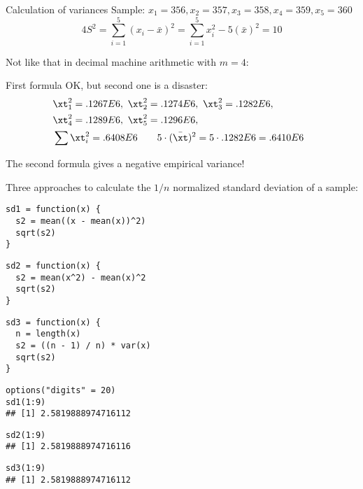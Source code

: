 \documentclass[11pt,compress,t,notes=noshow, xcolor=table]{beamer}
\begin{document}
\begin{vbframe}{Calculation of variances}
Sample: $x_1 = 356, x_2 = 357, x_3 = 358, x_4 = 359, x_5 = 360$
$$
4 S^2 = \sum\limits_{i=1}^5 (x_i - \bar x)^2 = \sum\limits_{i=1}^5 x_i^2 - 5(\bar x)^2 = 10
$$

Not like that in decimal machine arithmetic with $m=4$:

\lz 

First formula OK, but second one is a disaster:
\begin{eqnarray*}
&\xt_1^2 = .1267E6,\ \xt_2^2 = .1274E6,\ \xt_3^2 = .1282E6, & \\\
&\xt_4^2 = .1289E6,\ \xt_5^2 = .1296E6, & \\
&\sum \xt_i^2 = .6408E6 \qquad 5 \cdot (\bar {\xt})^2 = 5 \cdot .1282E6 = .6410E6&
\end{eqnarray*}

The second formula gives a negative empirical variance!


\framebreak

Three approaches to calculate the $1/n$ normalized standard deviation of a sample:
\lz
\footnotesize
\begin{verbatim}
sd1 = function(x) {
  s2 = mean((x - mean(x))^2)
  sqrt(s2)
}
\end{verbatim}

\vspace{0.1cm}
\begin{verbatim}
sd2 = function(x) {
  s2 = mean(x^2) - mean(x)^2
  sqrt(s2)
}
\end{verbatim}

\vspace{0.1cm}
\begin{verbatim}
sd3 = function(x) {
  n = length(x)
  s2 = ((n - 1) / n) * var(x)
  sqrt(s2)
}
\end{verbatim}


\framebreak
\lz

\begin{verbatim}
options("digits" = 20)
sd1(1:9)
## [1] 2.5819888974716112
\end{verbatim}

\vspace{0.3cm}
\begin{verbatim}
sd2(1:9)
## [1] 2.5819888974716116
\end{verbatim}

\vspace{0.3cm}
\begin{verbatim}
sd3(1:9)
## [1] 2.5819888974716112
\end{verbatim}



\end{vbframe}
\end{document}
